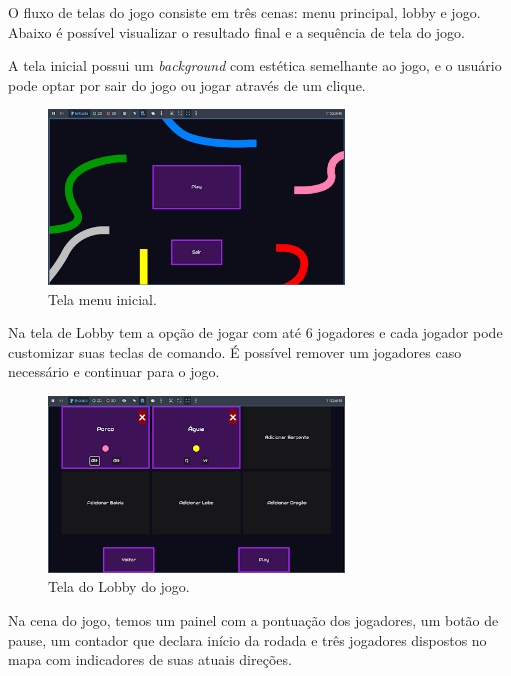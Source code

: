 O fluxo de telas do jogo consiste em três cenas: menu principal, lobby e jogo. Abaixo é possível visualizar o resultado final e a sequência de tela do jogo.

A tela inicial possui um \textit{background} com estética semelhante ao jogo, e o usuário pode optar por sair do jogo ou jogar através de um clique.

\begin{figure}[htbp]
    \centering
    \caption{Tela menu inicial.}
    \label{fig:menu-inical}
    \includegraphics[width=0.7\textwidth]{figuras/menu-game.png}
\end{figure}

Na tela de Lobby tem a opção de jogar com até 6 jogadores e cada jogador pode customizar suas teclas de comando. É possível remover um jogadores caso necessário e continuar para o jogo.

\begin{figure}[htbp]
    \centering
    \caption{Tela do Lobby do jogo.}
    \label{fig:menu-lobby}
    \includegraphics[width=0.7\textwidth]{figuras/lobby-game.png}
\end{figure}

Na cena do jogo, temos um painel com a pontuação dos jogadores, um botão de pause, um contador que declara início da rodada e três jogadores dispostos no mapa com indicadores de suas atuais direções.

